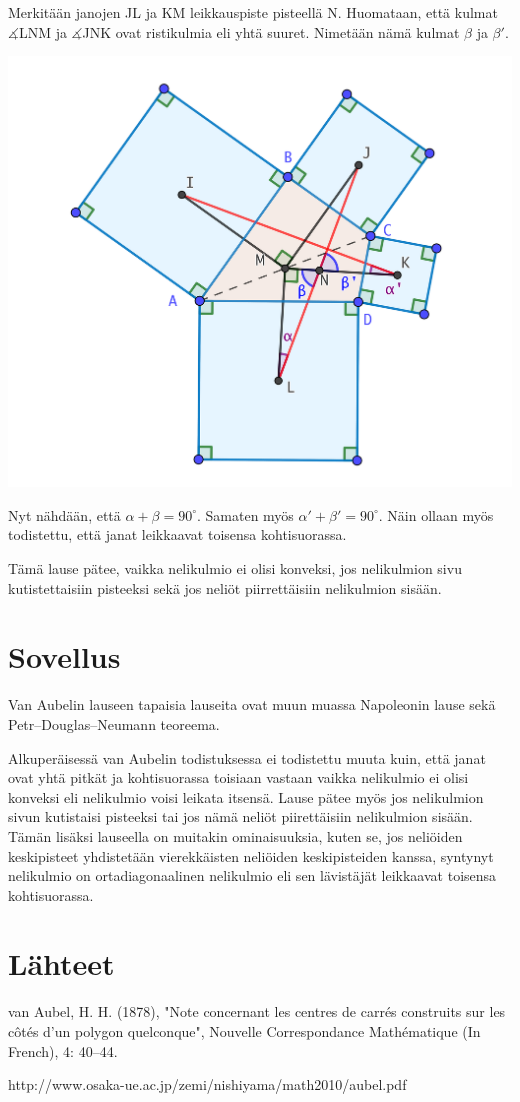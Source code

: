 \documentclass{article}
\begin{document}
Merkitään janojen JL ja KM leikkauspiste pisteellä N. Huomataan, että kulmat $\measuredangle$LNM ja $\measuredangle$JNK ovat ristikulmia eli yhtä suuret. Nimetään nämä kulmat $\beta$ ja $\beta'$.

\begin{center}
    \includegraphics[scale=0.3]{todistuksenjatkoa.png}
\end{center}

Nyt nähdään, että $\alpha + \beta = 90^\circ$. Samaten myös $\alpha' + \beta' = 90^\circ$. Näin ollaan myös todistettu, että janat leikkaavat toisensa kohtisuorassa.

Tämä lause pätee, vaikka nelikulmio ei olisi konveksi, jos nelikulmion sivu kutistettaisiin pisteeksi sekä jos neliöt piirrettäisiin nelikulmion sisään.

\pagebreak
\section{Sovellus}

Van Aubelin lauseen tapaisia lauseita ovat muun muassa Napoleonin lause sekä Petr–Douglas–Neumann teoreema.

Alkuperäisessä van Aubelin todistuksessa ei todistettu muuta kuin, että janat ovat yhtä pitkät ja kohtisuorassa toisiaan vastaan vaikka nelikulmio ei olisi konveksi eli nelikulmio voisi leikata itsensä. Lause pätee myös jos nelikulmion sivun kutistaisi pisteeksi tai jos nämä neliöt piirettäisiin nelikulmion sisään. 
Tämän lisäksi lauseella on muitakin ominaisuuksia, kuten se, jos neliöiden keskipisteet yhdistetään vierekkäisten neliöiden keskipisteiden kanssa, syntynyt nelikulmio on ortadiagonaalinen nelikulmio eli sen lävistäjät leikkaavat toisensa kohtisuorassa.

\pagebreak
\section{Lähteet}
van Aubel, H. H. (1878), "Note concernant les centres de carrés construits sur les côtés d'un polygon quelconque", Nouvelle Correspondance Mathématique (In French), 4: 40–44.

http://www.osaka-ue.ac.jp/zemi/nishiyama/math2010/aubel.pdf
\end{document}
